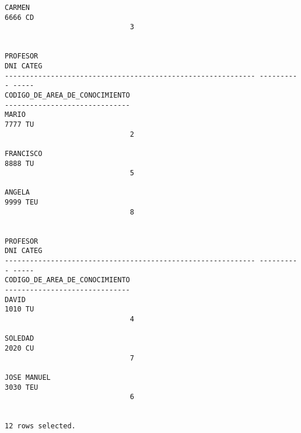 \documentclass[11pt]{report}
\begin{document}
\begin{itemize}
\begin{verbatim}
CARMEN                                                             6666 CD      
                              3                                                  
                                                                                

PROFESOR                                                            DNI CATEG   
------------------------------------------------------------ ---------- -----   
CODIGO_DE_AREA_DE_CONOCIMIENTO                                                  
------------------------------                                                  
MARIO                                                              7777 TU      
                              2                                                  
                                                                                
FRANCISCO                                                          8888 TU      
                              5                                                  
                                                                                
ANGELA                                                             9999 TEU     
                              8                                                  
                                                                                

PROFESOR                                                            DNI CATEG   
------------------------------------------------------------ ---------- -----   
CODIGO_DE_AREA_DE_CONOCIMIENTO                                                  
------------------------------                                                  
DAVID                                                              1010 TU      
                              4                                                  
                                                                                
SOLEDAD                                                            2020 CU      
                              7                                                  
                                                                                
JOSE MANUEL                                                        3030 TEU     
                              6                                                  
                                                                                

12 rows selected.
  \end{verbatim}
\end{itemize}
\end{document}
